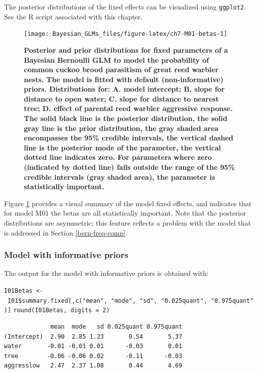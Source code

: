 \documentclass[
]{book}
\begin{document}
The posterior distributions of the fixed effects can be visualized using \texttt{ggplot2}. See the R script associated with this chapter.



\begin{figure}

{\centering \texttt{[image: Bayesian\_GLMs\_files/figure-latex/ch7-M01-betas-1]} 

}

\caption{\textbf{Posterior and prior distributions for fixed parameters of a Bayesian Bernoulli GLM to model the probability of common cuckoo brood parasitism of great reed warbler nests. The model is fitted with default (non-informative) priors. Distributions for: A. model intercept; B. slope for distance to open water; C. slope for distance to nearest tree; D. effect of parental reed warbler aggressive response. The solid black line is the posterior distribution, the solid gray line is the prior distribution, the gray shaded area encompasses the 95\% credible intervals, the vertical dashed line is the posterior mode of the parameter, the vertical dotted line indicates zero. For parameters where zero (indicated by dotted line) falls outside the range of the 95\% credible intervals (gray shaded area), the parameter is statistically important.}}\label{fig:ch7-M01-betas}
\end{figure}

Figure \ref{fig:ch7-M01-betas} provides a visual summary of the model fixed effects, and indicates that for model M01 the betas are all statistically important. Note that the posterior distributions are asymmetric; this feature reflects a problem with the model that is addressed in Section \ref{bern-freq-comp}.

\hypertarget{bern-inf-priors}{%
\subsubsection{Model with informative priors}\label{bern-inf-priors}}

The output for the model with informative priors is obtained with:

\texttt{I01Betas\ \textless{}-\ I01\$summary.fixed{[},c("mean",\ "mode",\ "sd",\ "0.025quant",\ "0.975quant"){]}}
\texttt{round(I01Betas,\ digits\ =\ 2)}

\begin{verbatim}
             mean  mode   sd 0.025quant 0.975quant
(Intercept)  2.90  2.85 1.23       0.54       5.37
water       -0.01 -0.01 0.01      -0.03       0.01
tree        -0.06 -0.06 0.02      -0.11      -0.03
aggresslow   2.47  2.37 1.08       0.44       4.69
\end{verbatim}
\end{document}
